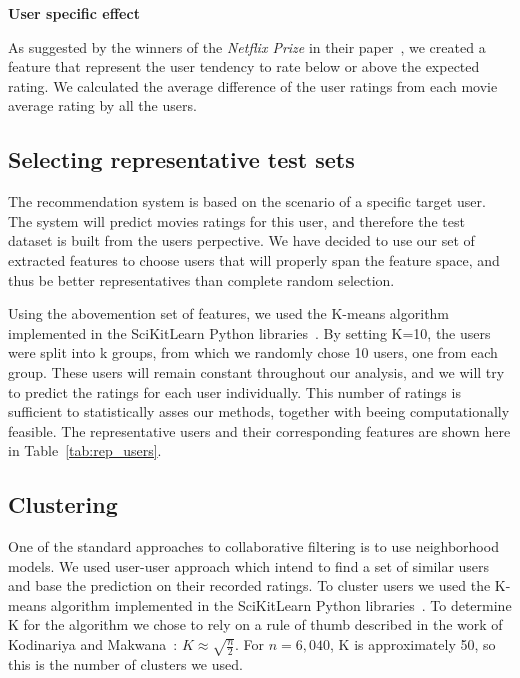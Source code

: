 \textbf{User specific effect}

As suggested by the winners of the \textit{Netflix Prize} in their paper~\cite{bell2007bellkor}, we created a feature that represent the user tendency to rate below or above the expected rating. We calculated the average difference of the user ratings from each movie average rating by all the users.

\subsection{Selecting representative test sets}
The recommendation system is based on the scenario of a specific target user. The system will predict movies ratings for this user, and therefore the test dataset is built from the users perpective. We have decided to use our set of extracted features to choose users that will properly span the feature space, and thus be better representatives than complete random selection. 

Using the abovemention set of features, we used the K-means algorithm implemented in the SciKitLearn Python libraries~\cite{pedregosa2011scikit}. By setting K=10, the users were split into k groups, from which we randomly chose 10 users, one from each group. These users will remain constant throughout our analysis, and we will try to predict the ratings for each user individually. This number of ratings is sufficient to statistically asses our methods, together with beeing computationally feasible. The representative users and their corresponding features are shown here in Table~\ref{tab:rep_users}.


\subsection{Clustering}


One of the standard approaches to collaborative filtering is to use neighborhood models. We used user-user approach which intend to find a set of similar users and base the prediction on their recorded ratings. To cluster users we used the K-means algorithm implemented in the SciKitLearn Python libraries~\cite{pedregosa2011scikit}. To determine K for the algorithm we chose to rely on a rule of thumb described in the work of Kodinariya and Makwana~\cite{kodinariya2013review}: $K\approx\sqrt{\frac{n}{2}}$. For $n=6,040$, K is approximately 50, so this is the number of clusters we used.


